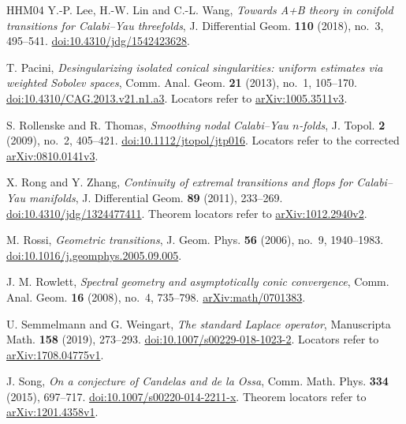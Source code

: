 \begin{thebibliography}{HHM04}
Y.-P. Lee, H.-W. Lin and C.-L. Wang,
\emph{Towards A+B theory in conifold transitions for Calabi--Yau threefolds},
J. Differential Geom. \textbf{110} (2018), no.~3, 495--541.
\href{https://doi.org/10.4310/jdg/1542423628}{doi:10.4310/jdg/1542423628}.

T. Pacini,
\emph{Desingularizing isolated conical singularities: uniform estimates via
weighted Sobolev spaces},
Comm. Anal. Geom. \textbf{21} (2013), no.~1, 105--170.
\href{https://doi.org/10.4310/CAG.2013.v21.n1.a3}{doi:10.4310/CAG.2013.v21.n1.a3}.
Locators refer to \href{https://arxiv.org/abs/1005.3511v3}{arXiv:1005.3511v3}.

S. Rollenske and R. Thomas,
\emph{Smoothing nodal Calabi--Yau $n$-folds},
J. Topol. \textbf{2} (2009), no.~2, 405--421.
\href{https://doi.org/10.1112/jtopol/jtp016}{doi:10.1112/jtopol/jtp016}.
Locators refer to the corrected
\href{https://arxiv.org/abs/0810.0141v3}{arXiv:0810.0141v3}.

X. Rong and Y. Zhang,
\emph{Continuity of extremal transitions and flops for Calabi--Yau manifolds},
J. Differential Geom. \textbf{89} (2011), 233--269.
\href{https://doi.org/10.4310/jdg/1324477411}{doi:10.4310/jdg/1324477411}.
Theorem locators refer to \href{https://arxiv.org/abs/1012.2940v2}{arXiv:1012.2940v2}.

M. Rossi,
\emph{Geometric transitions},
J. Geom. Phys. \textbf{56} (2006), no.~9, 1940--1983.\newline
\href{https://doi.org/10.1016/j.geomphys.2005.09.005}{doi:10.1016/j.geomphys.2005.09.005}.

J. M. Rowlett,
\emph{Spectral geometry and asymptotically conic convergence},
Comm. Anal. Geom. \textbf{16} (2008), no.~4, 735--798.
\href{https://arxiv.org/abs/math/0701383}{arXiv:math/0701383}.

U. Semmelmann and G. Weingart,
\emph{The standard Laplace operator},
Manuscripta Math. \textbf{158} (2019), 273--293.
\href{https://doi.org/10.1007/s00229-018-1023-2}{doi:10.1007/s00229-018-1023-2}.
Locators refer to \href{https://arxiv.org/abs/1708.04775v1}{arXiv:1708.04775v1}.

J. Song,
\emph{On a conjecture of Candelas and de la Ossa},
Comm. Math. Phys. \textbf{334} (2015), 697--717.
\href{https://doi.org/10.1007/s00220-014-2211-x}{doi:10.1007/s00220-014-2211-x}.
Theorem locators refer to \href{https://arxiv.org/abs/1201.4358v1}{arXiv:1201.4358v1}.


\end{thebibliography}
